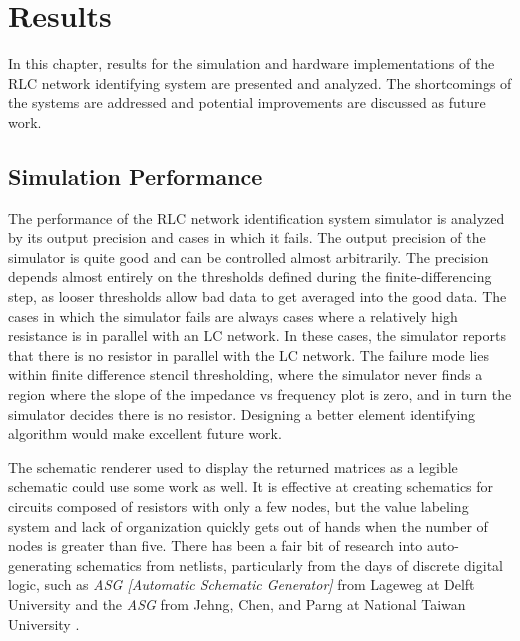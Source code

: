 \documentclass[11pt,twoside]{mitthesis}
\begin{document}
\fi

\chapter{Results}
In this chapter, results for the simulation and hardware implementations of the RLC network identifying system are presented and analyzed.
The shortcomings of the systems are addressed and potential improvements are discussed as future work.

\section{Simulation Performance}
The performance of the RLC network identification system simulator is analyzed by its output precision and cases in which it fails.
The output precision of the simulator is quite good and can be controlled almost arbitrarily.
The precision depends almost entirely on the thresholds defined during the finite-differencing step, as looser thresholds allow bad data to get averaged into the good data.
The cases in which the simulator fails are always cases where a relatively high resistance is in parallel with an LC network.
In these cases, the simulator reports that there is no resistor in parallel with the LC network.
The failure mode lies within finite difference stencil thresholding, where the simulator never finds a region where the slope of the impedance vs frequency plot is zero, and in turn the simulator decides there is no resistor.
Designing a better element identifying algorithm would make excellent future work.

The schematic renderer used to display the returned matrices as a legible schematic could use some work as well.
It is effective at creating schematics for circuits composed of resistors with only a few nodes, but the value labeling system and lack of organization quickly gets out of hands when the number of nodes is greater than five.
There has been a fair bit of research into auto-generating schematics from netlists, particularly from the days of discrete digital logic, such as \emph{ASG [Automatic Schematic Generator]} from Lageweg at Delft University \cite{delft} and the \emph{ASG} from Jehng, Chen, and Parng at National Taiwan University \cite{taiwan}.


\end{document}

